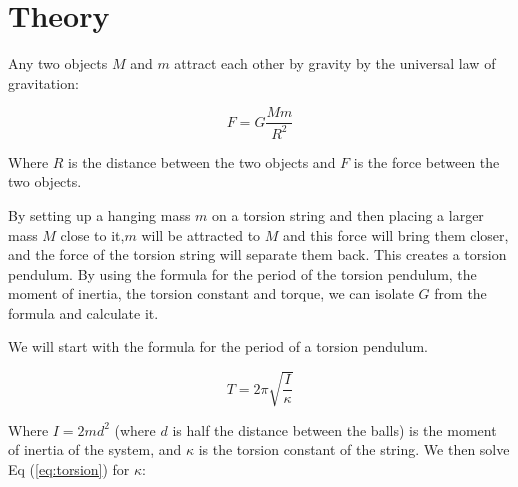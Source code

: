 \documentclass{report}
\begin{document}
\section*{Theory}

Any two objects $M$ and $m$ attract each other by gravity by the universal law of gravitation:

\begin{equation}
    F=G\frac{Mm}{R^2}
\end{equation}

Where $R$ is the distance between the two objects and $F$ is the force between the two objects.

By setting up a hanging mass $m$ on a torsion string and then placing a larger mass $M$ close to it,$m$ will be attracted to $M$ and this force will bring them closer, and the force of the torsion string will separate them back. This creates a torsion pendulum. By using the formula for the period of the torsion pendulum, the moment of inertia, the torsion constant and torque, we can isolate $G$ from the formula and calculate it.


We will start with the formula for the period of a torsion pendulum.

\begin{equation}
    T=2\pi\sqrt{\frac{I}{\kappa}} \label{eq:torsion}
\end{equation}

Where $I = 2md^2$ (where $d$ is half the distance between the balls) is the moment of inertia of the system, and $\kappa$ is the torsion constant of the string. We then solve Eq (\ref{eq:torsion}) for $\kappa$:
\end{document}
